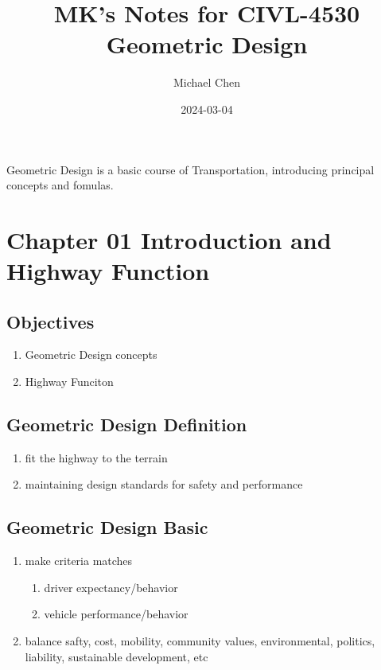 \documentclass{article}
\title{MK's Notes for CIVL-4530 Geometric Design}
\date{2024-03-04}
\author{Michael Chen}
\begin{document}
  \maketitle
  \newpage


  \tableofcontents
  \newpage


  Geometric Design is a basic course of Transportation, introducing principal concepts and fomulas.

  \newpage

  \setcounter{section}{0}
  \section{Chapter 01 Introduction and Highway Function}
  \subsection{Objectives}
  \begin{enumerate}
    \item Geometric Design concepts
    \item Highway Funciton
  \end{enumerate}

  \subsection{Geometric Design Definition}
  \begin{enumerate}
    \item fit the highway to the terrain
    \item maintaining design standards for safety and performance
  \end{enumerate}

  \subsection{Geometric Design Basic}
  \begin{enumerate}
    \item make criteria matches  
    \begin{enumerate}
      \item driver expectancy/behavior
      \item vehicle performance/behavior
    \end{enumerate}
    \item balance safty, cost, mobility, community values, environmental, politics, liability, sustainable development, etc
  \end{enumerate}
\end{document}
